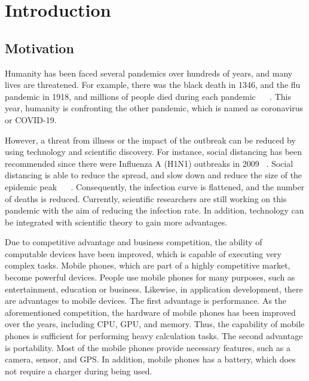 \chapter{Introduction}\label{intro}
    \section{Motivation}

        Humanity has been faced several pandemics over hundreds of years, and many lives are threatened.
        For example, there was the black death in 1346, and the flu pandemic in 1918, and millions of people died during each pandemic ~\cite{REF1-02} ~\cite{REF1-01}.
        This year, humanity is confronting the other pandemic, which is named as coronavirus or COVID-19.

        However, a threat from illness or the impact of the outbreak can be reduced by using technology and scientific discovery.
        For instance, social distancing has been recommended since there were Influenza A (H1N1) outbreaks in 2009 ~\cite{REF1-05}.
        Social distancing is able to reduce the spread, and slow down and reduce the size of the epidemic peak ~\cite{REF1-03} ~\cite{REF1-04}.
        Consequently, the infection curve is flattened, and the number of deaths is reduced.
        Currently, scientific researchers are still working on this pandemic with the aim of reducing the infection rate.
        In addition, technology can be integrated with scientific theory to gain more advantages.

        Due to competitive advantage and business competition, the ability of computable devices have been improved, which is capable of executing very complex tasks.
        Mobile phones, which are part of a highly competitive market, become powerful devices.
        People use mobile phones for many purposes, such as entertainment, education or business.
        Likewise, in application development, there are advantages to mobile devices.
        The first advantage is performance.
            As the aforementioned competition, the hardware of mobile phones has been improved over the years, including CPU, GPU, and memory.
            Thus, the capability of mobile phones is sufficient for performing heavy calculation tasks.
        The second advantage is portability.
            Most of the mobile phones provide necessary features, such as a camera, sensor, and GPS.
            In addition, mobile phones has a battery, which does not require a charger during being used.

